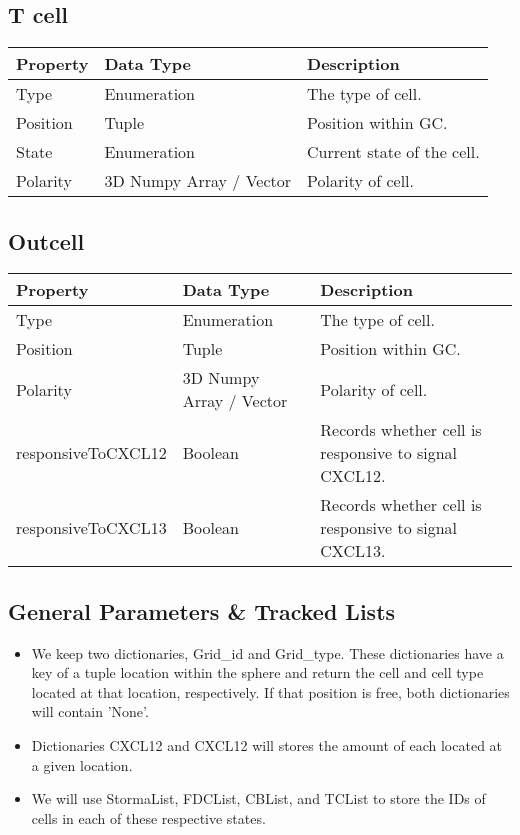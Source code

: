 \documentclass[english]{article}
\begin{document}
\subsection{T cell}
\begin{center}
\begin{tabular}{|C{2.1in}|C{2.1in}|C{2.1in}|}
\hline
\textbf{Property} & \textbf{Data Type} & \textbf{Description}
\tabularnewline
\hline
\hline
Type & Enumeration & The type of cell. 
\tabularnewline
\hline
Position & Tuple & Position within GC.
\tabularnewline
\hline
State & Enumeration & Current state of the cell.
\tabularnewline
\hline
Polarity & 3D Numpy Array / Vector & Polarity of cell.
\tabularnewline
\hline

\end{tabular}
\end{center}

\subsection{Outcell}
\begin{center}
\begin{tabular}{|C{2.1in}|C{2.1in}|C{2.1in}|}
\hline
\textbf{Property} & \textbf{Data Type} & \textbf{Description}
\tabularnewline
\hline
\hline
Type & Enumeration & The type of cell. 
\tabularnewline
\hline
Position & Tuple & Position within GC.
\tabularnewline
\hline
Polarity & 3D Numpy Array / Vector & Polarity of cell.
\tabularnewline
\hline
responsiveToCXCL12 & Boolean & Records whether cell is responsive to signal CXCL12.
\tabularnewline
\hline
responsiveToCXCL13 & Boolean & Records whether cell is responsive to signal CXCL13.
\tabularnewline
\hline

\end{tabular}
\end{center}


\subsection{General Parameters \& Tracked Lists}
\begin{itemize}

\item We keep two dictionaries, Grid\_id and Grid\_type. These dictionaries have a key of a tuple location within the sphere and return the cell and cell type located at that location, respectively. If that position is free, both dictionaries will contain 'None'.

\item Dictionaries CXCL12 and CXCL12 will stores the amount of each located at a given location. 

\item We will use StormaList, FDCList, CBList, and TCList to store the IDs of cells in each of these respective states. 

\end{itemize}
\end{document}
